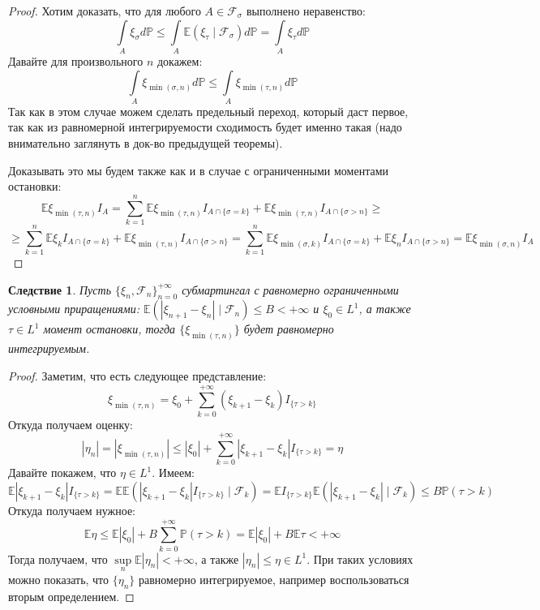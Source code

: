 \documentclass[12pt,a4paper]{article} %
\newtheorem{consequence}{Следствие}
\newcommand{\E}{\mathbb{E}}
\newcommand{\PR}{\mathbb{P}}
\newcommand{\F}{\mathcal{F}}
\begin{document}
	\begin{proof}
		Хотим доказать, что для любого $A\in\F_{\sigma}$ выполнено неравенство:
		$$\int\limits_A\xi_{\sigma}d\PR\leq\int\limits_A\E(\xi_{\tau}\mid\F_{\sigma})d\PR=\int\limits_A\xi_{\tau}d\PR$$
		Давайте для произвольного $n$ докажем:
		$$\int\limits_A\xi_{\min(\sigma,n)}d\PR\leq\int\limits_A\xi_{\min(\tau,n)}d\PR$$
		Так как в этом случае можем сделать предельный переход, который даст первое, так как из равномерной интегрируемости сходимость будет именно такая (надо внимательно заглянуть в док-во предыдущей теоремы).
		
		Доказывать это мы будем также как и в случае с ограниченными моментами остановки:
		$$\E\xi_{\min(\tau,n)}I_A=\sum_{k=1}^n\E\xi_{\min(\tau,n)}I_{A\cap\{\sigma=k\}}+\E\xi_{\min(\tau,n)}I_{A\cap\{\sigma>n\}}\geq$$
		$$\geq\sum_{k=1}^n\E\xi_kI_{A\cap\{\sigma=k\}}+\E\xi_{\min(\tau,n)}I_{A\cap\{\sigma>n\}}=\sum_{k=1}^n\E\xi_{\min(\sigma,k)}I_{A\cap\{\sigma=k\}}+\E\xi_nI_{A\cap\{\sigma>n\}}=\E\xi_{\min(\sigma,n)}I_A$$
	\end{proof}
	\begin{consequence}
		Пусть $\{\xi_n,\F_n\}_{n=0}^{+\infty}$ субмартингал с равномерно ограниченными условными приращениями: $\E(|\xi_{n+1}-\xi_n|\mid\F_n)\leq B<+\infty$ и $\xi_0\in L^1$, а также $\tau\in L^1$ момент остановки, тогда $\{\xi_{\min(\tau,n)}\}$ будет равномерно интегрируемым. 
	\end{consequence}
	\begin{proof}
		Заметим, что есть следующее представление:
		$$\xi_{\min(\tau,n)}=\xi_0+\sum_{k=0}^{+\infty}(\xi_{k+1}-\xi_k)I_{\{\tau>k\}}$$
		Откуда получаем оценку:
		$$|\eta_n|=|\xi_{\min(\tau,n)}|\leq|\xi_0|+\sum_{k=0}^{+\infty}|\xi_{k+1}-\xi_k|I_{\{\tau>k\}}=\eta$$
		Давайте покажем, что $\eta\in L^1$. Имеем:
		$$\E|\xi_{k+1}-\xi_k|I_{\{\tau>k\}}=\E\E(|\xi_{k+1}-\xi_k|I_{\{\tau>k\}}\mid\F_k)=\E I_{\{\tau>k\}}\E(|\xi_{k+1}-\xi_k|\mid\F_k)\leq B\PR(\tau>k)$$
		Откуда получаем нужное:
		$$\E\eta\leq\E|\xi_0|+B\sum_{k=0}^{+\infty}\PR(\tau>k)=\E|\xi_0|+B\E\tau<+\infty$$
		Тогда получаем, что $\sup\limits_n\E|\eta_n|<+\infty$, а также $|\eta_n|\leq\eta\in L^1$. При таких условиях можно показать, что $\{\eta_n\}$ равномерно интегрируемое, например воспользоваться вторым определением.
	\end{proof}
\end{document}
